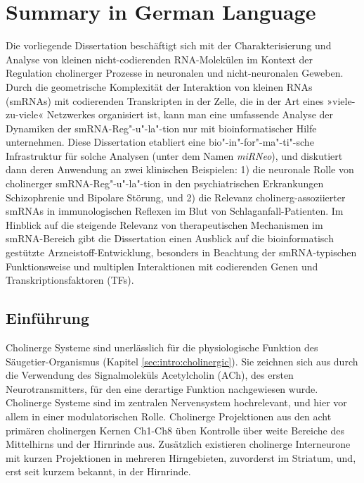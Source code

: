 \newpage

\section{Summary in German Language}


Die vorliegende Dissertation beschäftigt sich mit der Charakterisierung und Analyse von kleinen nicht-codierenden RNA-Molekülen im Kontext der Regulation cholinerger Prozesse in neuronalen und nicht-neuronalen Geweben. Durch die geometrische Komplexität der Interaktion von kleinen RNAs (smRNAs) mit codierenden Transkripten in der Zelle, die in der Art eines »viele-zu-viele« Netzwerkes organisiert ist, kann man eine umfassende Analyse der Dynamiken der smRNA-Reg"-u"-la"-tion nur mit bioinformatischer Hilfe unternehmen. Diese Dissertation etabliert eine bio"-in"-for"-ma"-ti"-sche Infrastruktur für solche Analysen (unter dem Namen \emph{miRNeo}), und diskutiert dann deren Anwendung an zwei klinischen Beispielen: 1) die neuronale Rolle von cholinerger smRNA-Reg"-u"-la"-tion in den psychiatrischen Erkrankungen Schizophrenie und Bipolare Störung,\cite{Lobentanzer2019a} und 2) die Relevanz cholinerg-assoziierter smRNAs in immunologischen Reflexen im Blut von Schlaganfall-Patienten.\cite{Winek2020} Im Hinblick auf die steigende Relevanz von therapeutischen Mechanismen im smRNA-Bereich gibt die Dissertation einen Ausblick auf die bioinformatisch gestützte Arzneistoff-Entwicklung, besonders in Beachtung der smRNA-typischen Funktionsweise und multiplen Interaktionen mit codierenden Genen und Transkriptionsfaktoren (TFs).

\subsection{Einführung}
Cholinerge Systeme sind unerlässlich für die physiologische Funktion des Säugetier-Organismus (Kapitel \ref{sec:intro:cholinergic}). Sie zeichnen sich aus durch die Verwendung des Signalmoleküls Acetylcholin (ACh), des ersten Neurotransmitters, für den eine derartige Funktion nachgewiesen wurde.\cite{Dale1914,Loewi1921,Dale1929} Cholinerge Systeme sind im zentralen Nervensystem hochrelevant, und hier vor allem in einer modulatorischen Rolle. Cholinerge Projektionen aus den acht primären cholinergen Kernen Ch1-Ch8 üben Kontrolle über weite Bereiche des Mittelhirns und der Hirnrinde aus.\cite{Mesulam1984} Zusätzlich existieren cholinerge Interneurone mit kurzen Projektionen in mehreren Hirngebieten, zuvorderst im Striatum, und, erst seit kurzem bekannt, in der Hirnrinde.

